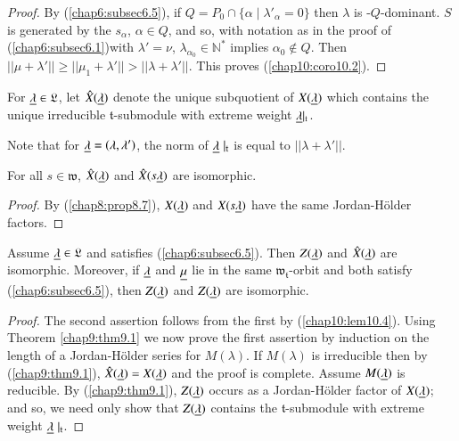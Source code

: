 \begin{proof}
By (\ref{chap6:subsec6.5}), if $Q = P_0 \cap \{\alpha \mid \lambda'_\alpha = 0\}$ then
$\lambda$ is -$Q$-dominant. $S$ is generated by the $s_\alpha$,
$\alpha \in Q$, and so, with notation as in the proof of
(\ref{chap6:subsec6.1})\pageoriginale with  $\lambda' = \nu$, $\lambda_{\alpha_0} \in
\mathbb{N}^*$ implies $\alpha_0 \not\in Q$. Then $||\mu + \lambda'||
\geq ||\mu_1 + \lambda'|| > ||\lambda + \lambda'||$. This proves
(\ref{chap10:coro10.2}). 
\end{proof}

\begin{definition}\label{chap10:def10.3}
For $\underline{\lambda} \in \mathfrak{L}$, let $\hat{X} (\underline{\lambda})$ denote
the unique subquotient of $X(\underline{\lambda})$ which contains the unique
irreducible $\mathfrak{t}$-submodule with extreme weight
$\underline{\lambda}|_\mathfrak{t}$. 
\end{definition}

Note that for $\underline{\lambda} = (\lambda, \lambda')$, the norm of
$\underline{\lambda}\mid_\mathfrak{t}$ is equal to $||\lambda + \lambda'||$. 

\begin{lemma}\label{chap10:lem10.4}
For all $s \in \mathfrak{w}$, $\hat{X}(\underline{\lambda})$ and $\hat{X}(s\underline{\lambda})$ are  isomorphic. 
\end{lemma}

\begin{proof}
By (\ref{chap8:prop8.7}), $X(\underline{\lambda})$ and $X(s\underline{\lambda})$ have the same
Jordan-H\"older factors. 
\end{proof}

\begin{prop}\label{chap10:prop10.5}
Assume $\underline{\lambda} \in \mathfrak{L}$ and satisfies (\ref{chap6:subsec6.5}). Then
$Z(\underline{\lambda})$ and $\hat{X} (\underline{\lambda})$ are isomorphic. Moreover, if
$\underline{\lambda}$ and $\underline{\mu}$ lie in the same
$\mathfrak{w}_\mathfrak{t}$-orbit and both satisfy (\ref{chap6:subsec6.5}), then
$Z(\underline{\lambda})$ and $Z(\underline{\lambda})$  are isomorphic. 
\end{prop}

\begin{proof}
The second assertion follows from the first by  (\ref{chap10:lem10.4}). Using Theorem
\ref{chap9:thm9.1} we now prove the first assertion by induction on the length of a
Jordan-H\"older series for $M(\lambda)$. If $M(\lambda)$ is
irreducible then by (\ref{chap9:thm9.1}), $\hat{X}(\underline{\lambda}) = X(\underline{\lambda})$ and
the proof is complete. Assume $M(\underline{\lambda})$ is reducible. By (\ref{chap9:thm9.1}),
$Z(\underline{\lambda})$ occurs as a Jordan-H\"older factor of
$X(\underline{\lambda})$; and so, we need only show that $Z(\underline{\lambda})$
contains the $\mathfrak{t}$-submodule with extreme weight
$\underline{\lambda}\mid_\mathfrak{t}$.  
\end{proof}

